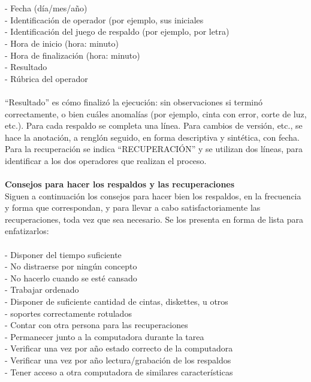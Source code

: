 \begin{enumerate}[3.1.]
\\
\\-	 Fecha (día/mes/año)
\\-	Identificación de operador (por ejemplo, sus iniciales
\\-	Identificación del juego de respaldo (por ejemplo, por letra) 
\\-	Hora de inicio (hora: minuto)
\\-	 Hora de finalización (hora: minuto)
\\-	Resultado
\\-	Rúbrica del operador 
\\
\\“Resultado” es cómo finalizó la ejecución: sin observaciones si terminó correctamente, o bien cuáles anomalías (por ejemplo, cinta con error, corte de luz, etc.). Para cada respaldo se completa una línea. Para cambios de versión, etc., se hace la anotación, a renglón seguido, en forma descriptiva y sintética, con fecha. Para la recuperación se indica “RECUPERACIÓN” y se utilizan dos líneas, para identificar a los dos operadores que realizan el proceso.  
\\
\\
\textbf{Consejos para hacer los respaldos y las recuperaciones }
\\Siguen a continuación los consejos para hacer bien los respaldos, en la frecuencia y forma que correspondan, y para llevar a cabo satisfactoriamente las recuperaciones, toda vez que sea necesario. Se los presenta en forma de lista para enfatizarlos: 
\\
\\-	Disponer del tiempo suficiente
\\-	No distraerse por ningún concepto
\\-	No hacerlo cuando se esté cansado
\\-	Trabajar ordenado
\\-	Disponer de suficiente cantidad de cintas, diskettes, u otros 
\\-	soportes correctamente rotulados
\\-	Contar con otra persona para las recuperaciones
\\-	Permanecer junto a la computadora durante la  tarea
\\-	Verificar una vez por año estado correcto de la computadora
\\-	Verificar una vez por año lectura/grabación de los respaldos
\\-	Tener acceso a otra computadora de similares características  

\end{enumerate}
